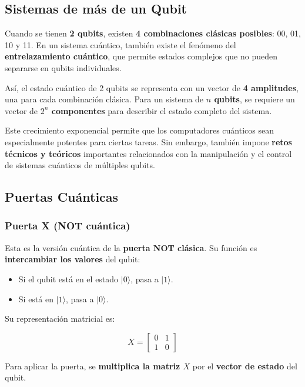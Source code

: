 \documentclass{article}
\begin{document}
\subsection*{Sistemas de más de un Qubit}

Cuando se tienen \textbf{2 qubits}, existen \textbf{4 combinaciones clásicas posibles}: 00, 01, 10 y 11. En un sistema cuántico, también existe el fenómeno del \textbf{entrelazamiento cuántico}, que permite estados complejos que no pueden separarse en qubits individuales.

Así, el estado cuántico de 2 qubits se representa con un vector de \textbf{4 amplitudes}, una para cada combinación clásica. Para un sistema de \textbf{$n$ qubits}, se requiere un vector de \textbf{$2^n$ componentes} para describir el estado completo del sistema.

Este crecimiento exponencial permite que los computadores cuánticos sean especialmente potentes para ciertas tareas. Sin embargo, también impone \textbf{retos técnicos y teóricos} importantes relacionados con la manipulación y el control de sistemas cuánticos de múltiples qubits.

\subsection*{Puertas Cuánticas}

\subsubsection*{Puerta X (NOT cuántica)}

Esta es la versión cuántica de la \textbf{puerta NOT clásica}. Su función es \textbf{intercambiar los valores} del qubit:

\begin{itemize}
    \item Si el qubit está en el estado $\vert 0 \rangle$, pasa a $\vert 1 \rangle$.
    \item Si está en $\vert 1 \rangle$, pasa a $\vert 0 \rangle$.
\end{itemize}

Su representación matricial es:

\[
X = \begin{bmatrix} 0 & 1 \\ 1 & 0 \end{bmatrix}
\]

Para aplicar la puerta, se \textbf{multiplica la matriz $X$} por el \textbf{vector de estado} del qubit.
\end{document}
